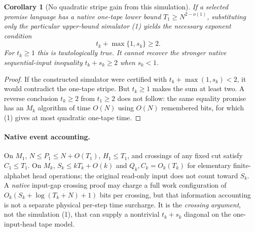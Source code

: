 \documentclass[11pt]{article}
\newtheorem{corollary}[theorem]{Corollary}
\begin{document}
\begin{corollary}[No quadratic stripe gain from this simulation]\label{cor:barrier}
If a selected promise language has a native one-tape lower bound $T_1\ge N^{2-o(1)}$, substituting only the particular upper-bound simulator (1) yields the necessary exponent condition
\[
 t_k+\max\{1,s_k\}\ge2.\tag{3}
\]
For $t_k\ge1$ this is tautologically true. It cannot recover the \emph{stronger} native sequential-input inequality $t_k+s_k\ge2$ when $s_k<1$.
\end{corollary}
\begin{proof}
If the constructed simulator were certified with $t_k+\max(1,s_k)<2$, it would contradict the one-tape stripe. But $t_k\ge1$ makes the sum at least two. A reverse conclusion $t_k\ge2$ from $t_1\ge2$ does not follow: the same equality promise has an $M_k$ algorithm of time $O(N)$ using $O(N)$ remembered bits, for which (1) gives at most quadratic one-tape time.
\end{proof}

\paragraph{Native event accounting.} On $M_1$, $N\le P_1\le N+O(T_1)$, $H_1\le T_1$, and crossings of any fixed cut satisfy $C_1\le T_1$. On $M_k$, $S_k\le kT_k+O(k)$ and $Q_k,C_k=O_k(T_k)$ for elementary finite-alphabet head operations; the original read-only input does not count toward $S_k$. A \emph{native} input-gap crossing proof may charge a full work configuration of $O_k(S_k+\log(T_k+N)+1)$ bits per crossing, but that information accounting is not a separate physical per-step time surcharge. It is the \emph{crossing argument}, not the simulation (1), that can supply a nontrivial $t_k+s_k$ diagonal on the one-input-head tape model.
\end{document}
